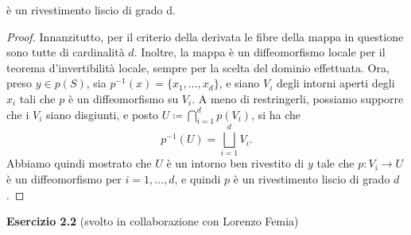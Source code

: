 \documentclass[a4paper]{article}
\theoremstyle{definition}
\theoremstyle{definition}
\theoremstyle{remark}
\theoremstyle{definition}
\begin{document}
è un rivestimento liscio di grado d.
\begin{proof}
    Innanzitutto, per il criterio della derivata le fibre della mappa in questione sono tutte di cardinalità $d$. Inoltre, la mappa è un diffeomorfismo locale per il teorema d'invertibilità locale, sempre per la scelta del dominio effettuata. Ora, preso $y\in p(S)$, sia $p^{-1}(x)=\{x_1, \dots , x_d\}$, e siano $V_i$ degli intorni aperti degli $x_i$ tali che $p$ è un diffeomorfismo su $V_i$. A meno di restringerli, possiamo supporre che i $V_i$ siano disgiunti, e posto $U\coloneqq \bigcap_{i=1}^d p(V_i)$, si ha che
    \[
        p^{-1}(U) = \bigsqcup_{i=1}^d V_i.
    \]
    Abbiamo quindi mostrato che $U$ è un intorno ben rivestito di $y$ tale che $p: V_i \to U$ è un diffeomorfismo per $i = 1, \ldots, d$, e quindi $p$ è un rivestimento liscio di grado $d$.
\end{proof}
\textbf{Esercizio 2.2} (svolto in collaborazione con Lorenzo Femia)
\end{document}
